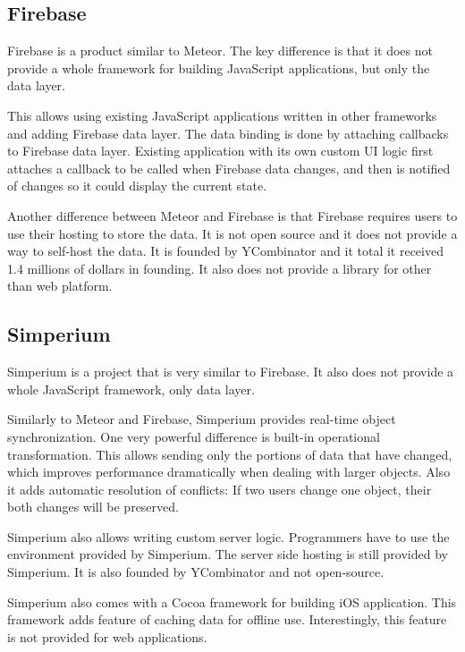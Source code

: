 \subsection{Firebase}

Firebase \citep{firebase} is a product similar to Meteor. The key difference is that it does not provide a whole framework for building JavaScript applications, but only the data layer.

This allows using existing JavaScript applications written in other frameworks and adding Firebase data layer. The data binding is done by attaching callbacks to Firebase data layer. Existing application with its own custom UI logic first attaches a callback to be called when Firebase data changes, and then is notified of changes so it could display the current state.

Another difference between Meteor and Firebase is that Firebase requires users to use their hosting to store the data. It is not open source and it does not provide a way to self-host the data. It is founded by YCombinator \citep{ycombinator} and it total it received 1.4 millions of dollars in founding. \citep{firebase_funding} It also does not provide a library for other than web platform.

\subsection{Simperium}

Simperium is a project that is very similar to Firebase. It also does not provide a whole JavaScript framework, only data layer.

Similarly to Meteor and Firebase, Simperium provides real-time object synchronization. One very powerful difference is built-in operational transformation. \citep{ot} This allows sending only the portions of data that have changed, which improves performance dramatically when dealing with larger objects. Also it adds automatic resolution of conflicts: If two users change one object, their both changes will be preserved.

Simperium also allows writing custom server logic. Programmers have to use the environment provided by Simperium. The server side hosting is still provided by Simperium. It is also founded by YCombinator \citep{ycombinator} and not open-source. 

Simperium also comes with a Cocoa framework for building iOS application. This framework adds feature of caching data for offline use. Interestingly, this feature is not provided for web applications.

